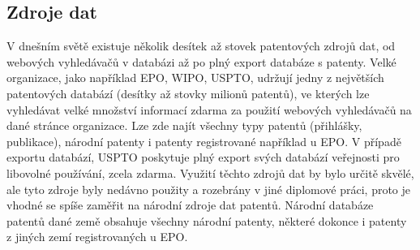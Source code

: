 \subsection{Zdroje dat}
V dnešním světě existuje několik desítek až stovek patentových zdrojů dat, od webových vyhledávačů v databázi až po plný export databáze s patenty. Velké organizace, jako například \gls{EPO}, \gls{WIPO}, \gls{USPTO}, udržují jedny z největších patentových databází (desítky až stovky milionů patentů), ve kterých lze vyhledávat velké množství informací zdarma za použití webových vyhledávačů na dané stránce organizace. Lze zde najít všechny typy patentů (přihlášky, publikace), národní patenty i patenty registrované například u \gls{EPO}. V případě exportu databází, \gls{USPTO} poskytuje plný export svých databází veřejnosti pro libovolné používání, zcela zdarma. Využití těchto zdrojů dat by bylo určitě skvělé, ale tyto zdroje byly nedávno použity a rozebrány v jiné diplomové práci, proto je vhodné se spíše zaměřit na národní zdroje dat patentů.
\newline
\indent Národní databáze patentů dané země obsahuje všechny národní patenty, některé dokonce i patenty z jiných zemí registrovaných u \gls{EPO}. 
